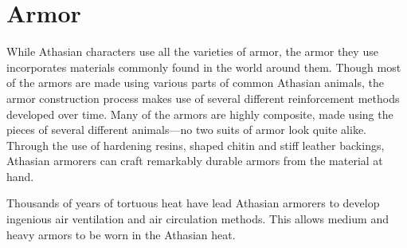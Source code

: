 \section{Armor}

While Athasian characters use all the varieties of armor, the armor they use incorporates materials commonly found in the world around them. Though most of the armors are made using various parts of common Athasian animals, the armor construction process makes use of several different reinforcement methods developed over time. Many of the armors are highly composite, made using the pieces of several different animals---no two suits of armor look quite alike. Through the use of hardening resins, shaped chitin and stiff leather backings, Athasian armorers can craft remarkably durable armors from the material at hand.

Thousands of years of tortuous heat have lead Athasian armorers to develop ingenious air ventilation and air circulation methods. This allows medium and heavy armors to be worn in the Athasian heat.


